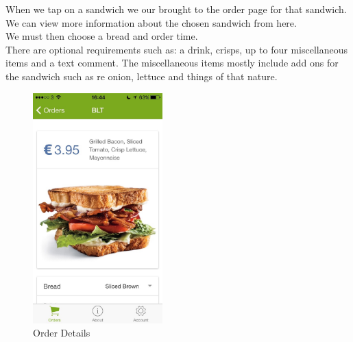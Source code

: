 \begin{minipage}{0.55\textwidth}
When we tap on a sandwich we our brought to the order page for that sandwich.
\\

We can view more information about the chosen sandwich from here.
\\

We must then choose a bread and order time.
\\

There are optional requirements such as: a drink, crisps, up to four miscellaneous items and a text comment.
The miscellaneous items mostly include add ons for the sandwich such as re onion, lettuce and things of that nature.

\end{minipage}
\begin{minipage}{5cm}
	\begin{figure}[H]
		\includegraphics[width=5cm]{img/mobile-app/screen-shots/IMG_2908.jpg}
		\caption{Order Details}
	\end{figure}
\end{minipage} \hfill

